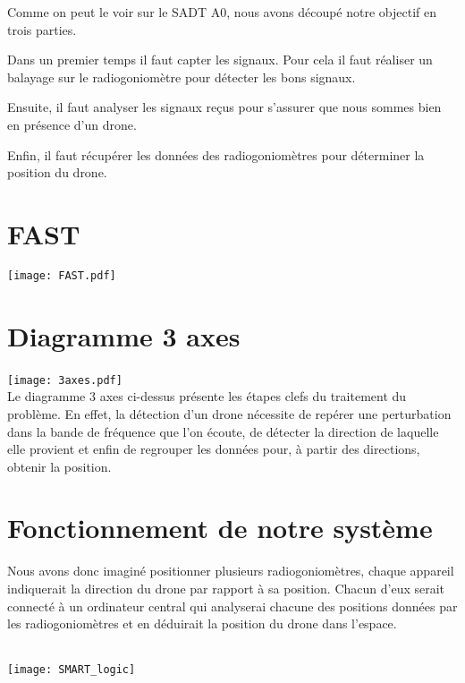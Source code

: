 \newpage
\parindent=15pt

Comme on peut le voir sur le SADT A0, nous avons découpé notre objectif en trois parties.

Dans un premier temps il faut capter les signaux. Pour cela il faut réaliser un balayage sur le radiogoniomètre pour détecter les bons signaux.

Ensuite, il faut analyser les signaux reçus pour s'assurer que nous sommes bien en présence d'un drone.

Enfin, il faut récupérer les données des radiogoniomètres pour déterminer la position du drone.


\section{FAST}

\hspace{-1.5cm}
\texttt{[image: FAST.pdf]}


\section{Diagramme 3 axes}

\hspace{-1.5cm}
\texttt{[image: 3axes.pdf]}
\parindent=15pt
~\\

Le diagramme 3 axes ci-dessus présente les étapes clefs du traitement du problème. En effet, la
détection d’un drone nécessite de repérer une perturbation dans la bande de fréquence que l’on écoute,
de détecter la direction de laquelle elle provient et enfin de regrouper les données pour, à partir des
directions, obtenir la position.

\section{Fonctionnement de notre système}

Nous avons donc imaginé positionner plusieurs radiogoniomètres, chaque appareil indiquerait la direction du drone par rapport à sa position. Chacun d'eux serait connecté à un ordinateur central qui analyserai chacune des positions données par les radiogoniomètres et en déduirait la position du drone dans l'espace.

~\\

\texttt{[image: SMART\_logic]}
\parindent=15pt



